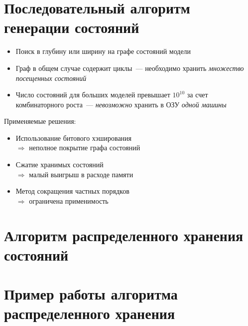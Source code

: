 \documentclass[12pt]{article}
\begin{document}
\section{Последовательный алгоритм генерации состояний}
\label{sec:seq-stategen}

\small{
  \begin{itemize}
  \item Поиск в глубину или ширину на графе состояний модели
  \item Граф в общем случае содержит циклы~--- необходимо хранить \textit{множество посещенных состояний}
  \item Число состояний для больших моделей превышает $10^{10}$ за счет комбинаторного
    роста~--- \textit{невозможно} хранить в ОЗУ \textit{одной машины}
  \end{itemize}
  
  \begin{minipage}[t]{0.25\linewidth}
    \begin{flushright}
      Применяемые решения:
    \end{flushright}
  \end{minipage}
  \begin{minipage}[t]{0.7\linewidth}
    \begin{flushleft}
      \begin{itemize}
      \item Использование битового \mbox{хэширования} \\ $\Rightarrow$ неполное покрытие графа состояний
      \item Сжатие хранимых состояний \\ $\Rightarrow$ малый выигрыш в расходе памяти
      \item Метод сокращения частных порядков \\ $\Rightarrow$ ограничена применимость
      \end{itemize}
    \end{flushleft}
  \end{minipage}
}

\section{Алгоритм распределенного хранения состояний}
\label{sec:distr-storage}



\section{Пример работы алгоритма распределенного хранения}
\label{sec:distr-storage2}
\end{document}
